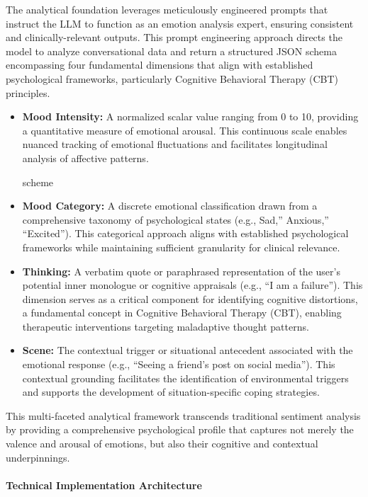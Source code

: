 The analytical foundation leverages meticulously engineered prompts that instruct the LLM to function as an emotion analysis expert, ensuring consistent and clinically-relevant outputs. This prompt engineering approach directs the model to analyze conversational data and return a structured JSON schema encompassing four fundamental dimensions that align with established psychological frameworks, particularly Cognitive Behavioral Therapy (CBT) principles.

\begin{itemize}
\item \textbf{Mood Intensity:} A normalized scalar value ranging from 0 to 10, providing a quantitative measure of emotional arousal. This continuous scale enables nuanced tracking of emotional fluctuations and facilitates longitudinal analysis of affective patterns.

scheme

\item \textbf{Mood Category:} A discrete emotional classification drawn from a comprehensive taxonomy of psychological states (e.g., Sad,'' Anxious,'' ``Excited''). This categorical approach aligns with established psychological frameworks while maintaining sufficient granularity for clinical relevance.

\item \textbf{Thinking:} A verbatim quote or paraphrased representation of the user's potential inner monologue or cognitive appraisals (e.g., ``I am a failure''). This dimension serves as a critical component for identifying cognitive distortions, a fundamental concept in Cognitive Behavioral Therapy (CBT), enabling therapeutic interventions targeting maladaptive thought patterns.

\item \textbf{Scene:} The contextual trigger or situational antecedent associated with the emotional response (e.g., ``Seeing a friend's post on social media''). This contextual grounding facilitates the identification of environmental triggers and supports the development of situation-specific coping strategies.
\end{itemize}

This multi-faceted analytical framework transcends traditional sentiment analysis by providing a comprehensive psychological profile that captures not merely the valence and arousal of emotions, but also their cognitive and contextual underpinnings.

\paragraph{Technical Implementation Architecture}

